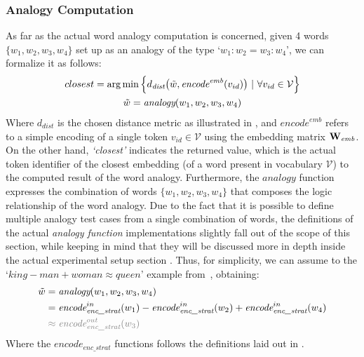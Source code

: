 
\subsubsection{Analogy Computation}

As far as the actual word analogy computation is concerned, given 4 words $\{w_1, w_2, w_3, w_4\}$ set up as an analogy of the type `$w_1 : w_2 = w_3 : w_4$', we can formalize it as follows:
\begin{equation}
    \label{eq:method_embeddings_analogy}
    \begin{gathered}
        closest = \arg\min {\Bigl\{ d_{\textit{dist}}\bigl(\tilde w, \textit{encode}^{\textit{emb}}(v_{id})\bigr) \ |\ \forall v_{id} \in \mathcal{V} \Bigr\}} \\
        \tilde w = \textit{analogy}(w_1, w_2, w_3, w_4)
    \end{gathered}
\end{equation}
Where $d_{\textit{dist}}$ is the chosen distance metric as illustrated in , and $\textit{encode}^{\textit{emb}}$ refers to a simple encoding of a single token $v_{id} \in \mathcal{V}$ using the embedding matrix $\bm{\mathbf{W}}_{\textit{emb}}$.
On the other hand, \emph{`closest'} indicates the returned value, which is the actual token identifier of the closest embedding (of a word present in vocabulary $\mathcal{V}$) to the computed result of the word analogy.
Furthermore, the $\textit{analogy}$ function expresses the combination of words $\{w_1, w_2, w_3, w_4\}$ that composes the logic relationship of the word analogy.
Due to the fact that it is possible to define multiple analogy test cases from a single combination of words, the definitions of the actual \emph{analogy function} implementations slightly fall out of the scope of this section, while keeping in mind that they will be discussed more in depth inside the actual experimental setup section .
Thus, for simplicity, we can assume to  the  `$king - man + woman \approx queen$' example from~\citet{mikolov2013}, obtaining:
\begin{equation}
    \label{eq:method_embeddings_analogy-function}
    \begin{aligned}
        \tilde w &= \textit{analogy}(w_1, w_2, w_3, w_4) \\
        &= {\textit{encode}}_{\textit{enc\_strat}}^{in}(w_1) - {\textit{encode}}_{\textit{enc\_strat}}^{in}(w_2) + {\textit{encode}}_{\textit{enc\_strat}}^{in}(w_4) \\
        &\color{gray} \approx {\textit{encode}}_{\textit{enc\_strat}}^{out}(w_3) 
    \end{aligned}
\end{equation}
Where the ${\textit{encode}}_{\textit{enc\_strat}}$ functions follows the definitions laid out in .


